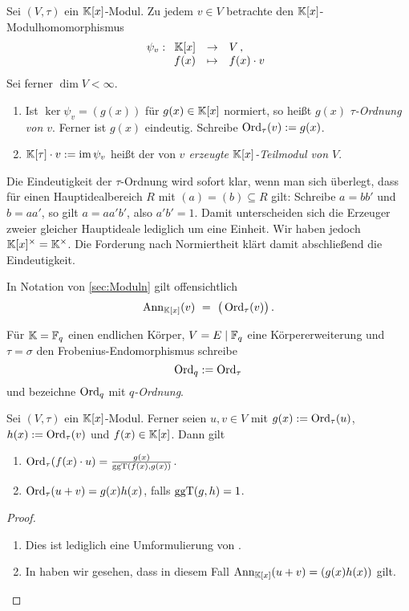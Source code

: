 \begin{definition}
  Sei $(V,\tau)$ ein $\mathbb{K}[x]$-Modul. Zu jedem $v \in V$ betrachte den
  $\mathbb{K}[x]$-Modulhomomorphismus
  \[ \psi_v: \funcdef{\K[x] & \to & V\,, \\
    f(x) & \mapsto & f(x)\cdot v }  \]
  Sei ferner $\dim V < \infty$.
  \begin{enumerate}
    \item Ist $\ker\psi_v = (g(x))$ für $g(x)\in \mathbb{K}[x]$ normiert, so heißt
      $g(x)$ \emph{$\tau$-Ordnung von $v$}\@. Ferner ist $g(x)$ eindeutig.
      Schreibe $\operatorname{Ord}_\tau(v) := g(x)$.
    \item $\mathbb{K}[\tau]\cdot v := \operatorname{im}{\psi_v}$ heißt der von \emph{$v$ erzeugte
      $\mathbb{K}[x]$-Teilmodul von $V$}.
  \end{enumerate}
\end{definition}

\begin{bemerkung}
  Die Eindeutigkeit der $\tau$-Ordnung wird sofort klar, wenn man sich
  überlegt, dass für einen Hauptidealbereich $R$ mit $(a) = (b) \subseteq R$ 
  gilt: Schreibe $a = b b'$ und $b = a a'$, so gilt $a = a a'b'$, also 
  $a'b' = 1$. Damit unterscheiden sich die Erzeuger zweier gleicher Hauptideale
  lediglich um eine Einheit. Wir haben jedoch $\mathbb{K}[x]^\times = \mathbb{K}^\times$. Die
  Forderung nach Normiertheit klärt damit abschließend die Eindeutigkeit.
\end{bemerkung}


\begin{bemerkung}
  In Notation von \autoref{sec:Moduln} gilt offensichtlich
  \[ \operatorname{Ann}_{\mathbb{K}[x]}(v) \ =\  \big(\operatorname{Ord}_\tau(v)\big) \,.\]
\end{bemerkung}

\begin{notation}
  Für $\mathbb{K} = \mathbb{F}_q$ einen endlichen Körper, $V = E \mid \mathbb{F}_q$ eine 
  Körpererweiterung und $\tau = \sigma$ den Frobenius-Endomorphismus schreibe
  \[ \operatorname{Ord}_q := \operatorname{Ord}_\tau \]
  und bezeichne $\operatorname{Ord}_q$ mit \emph{$q$-Ordnung}.
\end{notation}

\begin{lemma}
  \label{lemma:eigenschaften_tau_ordnung}
  Sei $(V,\tau)$ ein $\mathbb{K}[x]$-Modul. Ferner seien
  $u,v\in V$ mit $g(x) := \operatorname{Ord}_\tau(u)$, $h(x) := \operatorname{Ord}_\tau(v)$ und 
  $f(x) \in \mathbb{K}[x]$. Dann gilt
  \begin{enumerate}
    \item $\operatorname{Ord}_\tau(f(x)\cdot u) = \frac{g(x)}{\operatorname{ggT}(f(x),g(x))}$.
    \item $\operatorname{Ord}_\tau(u+v) = g(x)h(x)$, falls $\operatorname{ggT}(g,h) = 1$.
  \end{enumerate}
\end{lemma}
\begin{proof}
  \begin{enumerate}
    \item Dies ist lediglich eine Umformulierung von
      .
    \item In  haben wir gesehen, dass
      in diesem Fall $\operatorname{Ann}_{\mathbb{K}[x]}(u+v) = (g(x)h(x))$ gilt.
  \end{enumerate}
\end{proof}

